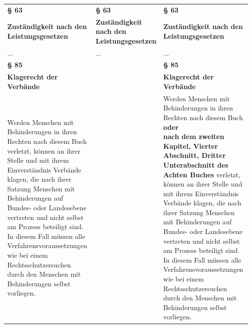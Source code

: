 \documentclass[10pt,a4paper,landscape]{article}
\begin{document}
\begin{longtable}{|L{8.2cm}|L{8.2cm}|L{8.2cm}|}
\hhline{|---|}
\textbf{\S{} 63} & \textbf{\S{} 63} & \textbf{\S{} 63} \\
\hhline{|---|}
\textbf{Zuständigkeit nach den Leistungsgesetzen} & \textbf{Zuständigkeit nach den Leistungsgesetzen} & \textbf{Zuständigkeit nach den Leistungsgesetzen} \\
\hhline{|---|}
... & ... & ... \\
\hhline{|---|}
\textbf{\S{} 85} &  & \textbf{\S{} 85} \\
\hhline{|---|}
\textbf{Klagerecht der Verbände} &  & \textbf{Klagerecht der Verbände} \\
\hhline{|---|}
Werden Menschen mit Behinderungen in  \newline ihren Rechten nach diesem Buch verletzt,  \newline können an ihrer Stelle und mit ihrem  \newline Einverständnis Verbände klagen, die nach  \newline ihrer Satzung Menschen mit  \newline Behinderungen auf Bundes- oder  \newline Landesebene vertreten und nicht selbst am  \newline Prozess beteiligt sind. In diesem Fall  \newline müssen alle Verfahrensvoraussetzungen  \newline wie bei einem Rechtsschutzersuchen durch  \newline den Menschen mit Behinderungen selbst  \newline vorliegen. &  & Werden Menschen mit Behinderungen in  \newline ihren Rechten nach diesem Buch \textbf{\textcolor{diffgreen}{oder  \newline nach dem zweiten Kapitel, Vierter  \newline Abschnitt, Dritter Unterabschnitt des  \newline Achten Buches}} verletzt, können an ihrer  \newline Stelle und mit ihrem Einverständnis  \newline Verbände klagen, die nach ihrer Satzung  \newline Menschen mit Behinderungen auf Bundes-  \newline oder Landesebene vertreten und nicht  \newline selbst am Prozess beteiligt sind. In diesem  \newline Fall müssen alle  \newline Verfahrensvoraussetzungen wie bei einem  \newline Rechtsschutzersuchen durch den  \newline Menschen mit Behinderungen selbst  \newline vorliegen. \\

\end{longtable}
\end{document}
